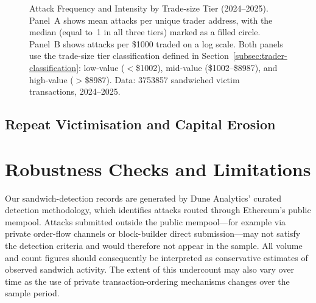 \documentclass[pdflatex, sn-basic]{sn-jnl}
\theoremstyle{thmstylethree}%
\begin{document}

	\begin{figure}[t]
		\centering
		
		\caption{Attack Frequency and Intensity by Trade-size Tier (2024--2025).
        Panel~A shows mean attacks per unique trader address, with the median (equal to~1
        in all three tiers) marked as a filled circle.
        Panel~B shows attacks per \$\num{1000} traded on a log scale.
        Both panels use the trade-size tier classification defined in
        Section~\ref{subsec:trader-classification}: low-value ($<$\$\num{1002}),
        mid-value (\$\num{1002}--\$\num{8987}), and high-value ($>$\$\num{8987}).
        Data: \num{3753857} sandwiched victim transactions, 2024--2025.}
	\end{figure}

	\subsection{Repeat Victimisation and Capital Erosion}
	\label{subsec:repeat-victimization}


	\section{Robustness Checks and Limitations}
	\label{sec:robustness}

    Our sandwich-detection records are generated by Dune Analytics' curated detection methodology, which identifies attacks routed through Ethereum's public mempool.
    Attacks submitted outside the public mempool---for example via private order-flow channels or block-builder direct submission---may not satisfy the detection criteria and would therefore not appear in the sample.
    All volume and count figures should consequently be interpreted as conservative estimates of observed sandwich activity.
    The extent of this undercount may also vary over time as the use of private transaction-ordering mechanisms changes over the sample period.
    
\end{document}
